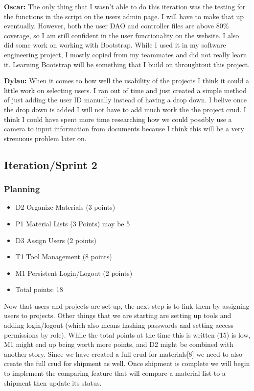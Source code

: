 \documentclass{article}
\begin{document}
\textbf{Oscar:} The only thing that I wasn't able to do this iteration was the testing for the functions in the script on the users admin page. I will have to make that up eventually. However, both the user DAO and controller files are above 80\% coverage, so I am still confident in the user functionality on the website. I also did some work on working with Bootstrap. While I used it in my software engineering project, I mostly copied from my teammates and did not really learn it. Learning Bootstrap will be something that I build on throughtout this project. 

\textbf{Dylan:} When it comes to how well the usability of the projects I think it could a little work on selecting users. I ran out of time and just created a simple method of just adding the user ID manually instead of having a drop down. I belive once the drop down is added I will not have to add much work the the project crud. I think I could have spent more time researching how we could possibly use a camera to input information from documents because I think this will be a very strenuous problem later on.  


\subsection{Iteration/Sprint 2}
\subsubsection{Planning}

\begin{itemize}
    \item D2 Organize Materials (3 points)
    \item P1 Material Lists (3 Points) may be 5
    \item D3 Assign Users (2 points)
    \item T1 Tool Management (8 points)
    \item M1 Persistent Login/Logout (2 points)
    \item Total points: 18 
\end{itemize}

Now that users and projects are set up, the next step is to link them by assigning users to projects. Other things that we are starting are setting up tools and adding login/logout (which also means hashing passwords and setting access permissions by role). While the total points at the time this is written (15) is low, M1 might end up being worth more points, and D2 might be combined with another story. Since we have created a full crud for materials[8] we need to also create the full crud for shipment as well. Once shipment is complete we will begin to implement the comparing feature that will compare a material list to a shipment then update its status.  
\end{document}
